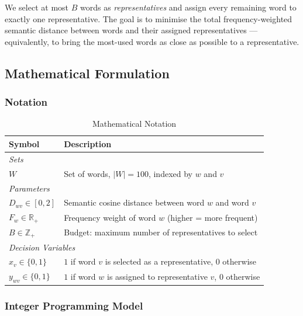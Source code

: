 \documentclass[11pt]{article}
\begin{document}
We select at most $B$ words as \emph{representatives} and assign every remaining
word to exactly one representative. The goal is to minimise the total
frequency-weighted semantic distance between words and their assigned representatives
--- equivalently, to bring the most-used words as close as possible to a representative.

\subsection{Mathematical Formulation}\label{sec:model}

\subsubsection*{Notation}

\begin{table}[h]
\caption{Mathematical Notation}
\label{tab:notation}
\centering
\renewcommand{\arraystretch}{1.3}
\begin{tabular}{ll}
\toprule
\textbf{Symbol} & \textbf{Description} \\
\midrule
\multicolumn{2}{l}{\textit{Sets}} \\
$W$ & Set of words, $|W| = 100$, indexed by $w$ and $v$ \\[4pt]
\multicolumn{2}{l}{\textit{Parameters}} \\
$D_{wv} \in [0,2]$ & Semantic cosine distance between word $w$ and word $v$ \\
$F_{w} \in \mathbb{R}_{+}$ & Frequency weight of word $w$ (higher = more frequent) \\
$B \in \mathbb{Z}_{+}$ & Budget: maximum number of representatives to select \\[4pt]
\multicolumn{2}{l}{\textit{Decision Variables}} \\
$x_{v} \in \{0,1\}$ & $1$ if word $v$ is selected as a representative, $0$ otherwise \\
$y_{wv} \in \{0,1\}$ & $1$ if word $w$ is assigned to representative $v$, $0$ otherwise \\
\bottomrule
\end{tabular}
\end{table}

\subsubsection*{Integer Programming Model}
\end{document}
